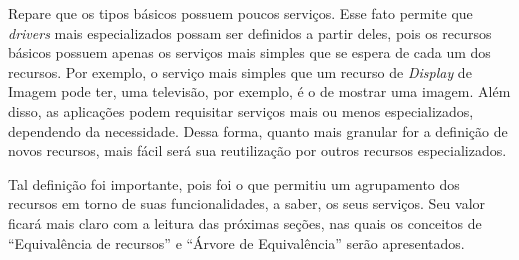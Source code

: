 Repare que os tipos básicos possuem poucos serviços. Esse fato permite que \emph{drivers} mais especializados possam ser definidos a partir deles, pois os recursos básicos possuem apenas os serviços mais simples que se espera de cada um dos recursos. Por exemplo, o serviço mais simples que um recurso de \emph{Display} de Imagem pode ter, uma televisão, por exemplo, é o de mostrar uma imagem. Além disso, as aplicações podem requisitar serviços mais ou menos especializados, dependendo da necessidade. Dessa forma, quanto mais granular for a definição de novos recursos, mais fácil será sua reutilização por outros recursos especializados. 

Tal definição foi importante, pois foi o que permitiu um agrupamento dos recursos em torno de suas funcionalidades, a saber, os seus serviços. Seu valor ficará mais claro com a leitura das próximas seções, nas quais os conceitos de ``Equivalência de recursos'' e ``Árvore de Equivalência'' serão apresentados.




